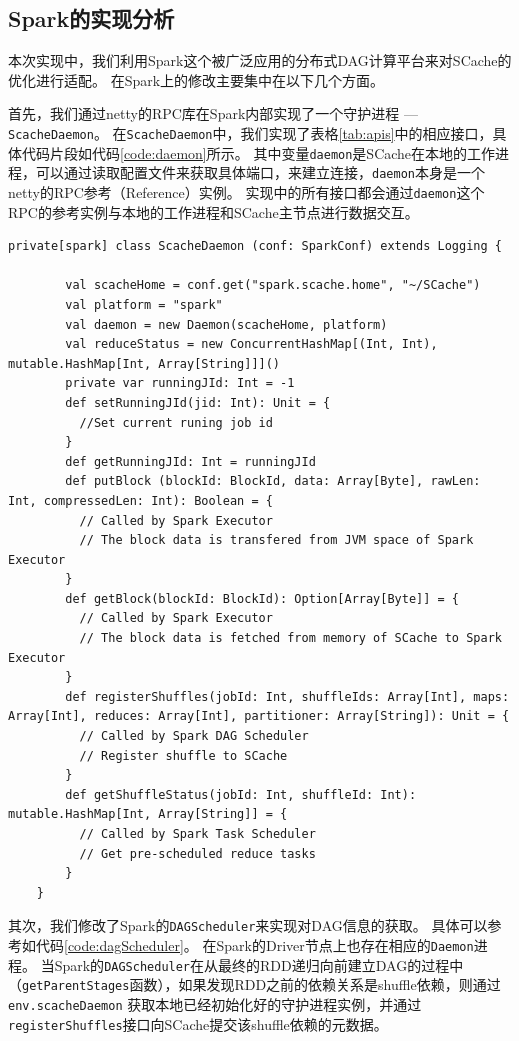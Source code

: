 \subsection{Spark的实现分析}
本次实现中，我们利用Spark这个被广泛应用的分布式DAG计算平台来对SCache的优化进行适配。
在Spark上的修改主要集中在以下几个方面。

首先，我们通过netty\cite{netty}的RPC库在Spark内部实现了一个守护进程 --- \verb|ScacheDaemon|。
在\verb|ScacheDaemon|中，我们实现了表格\ref{tab:apis}中的相应接口，具体代码片段如代码\ref{code:daemon}所示。
其中变量\verb|daemon|是SCache在本地的工作进程，可以通过读取配置文件来获取具体端口，来建立连接，\verb|daemon|本身是一个netty的RPC参考（Reference）实例。
实现中的所有接口都会通过\verb|daemon|这个RPC的参考实例与本地的工作进程和SCache主节点进行数据交互。

\begin{lstlisting}[style={myScalastyle}, caption={ScacheDaemon代码片段}, label={code:daemon}]
    private[spark] class ScacheDaemon (conf: SparkConf) extends Logging {

        val scacheHome = conf.get("spark.scache.home", "~/SCache")
        val platform = "spark"  
        val daemon = new Daemon(scacheHome, platform)   
        val reduceStatus = new ConcurrentHashMap[(Int, Int), mutable.HashMap[Int, Array[String]]]() 
        private var runningJId: Int = -1    
        def setRunningJId(jid: Int): Unit = {
          //Set current runing job id
        }   
        def getRunningJId: Int = runningJId 
        def putBlock (blockId: BlockId, data: Array[Byte], rawLen: Int, compressedLen: Int): Boolean = {
          // Called by Spark Executor
          // The block data is transfered from JVM space of Spark Executor
        }   
        def getBlock(blockId: BlockId): Option[Array[Byte]] = {
          // Called by Spark Executor
          // The block data is fetched from memory of SCache to Spark Executor
        }   
        def registerShuffles(jobId: Int, shuffleIds: Array[Int], maps: Array[Int], reduces: Array[Int], partitioner: Array[String]): Unit = {
          // Called by Spark DAG Scheduler
          // Register shuffle to SCache
        }   
        def getShuffleStatus(jobId: Int, shuffleId: Int): mutable.HashMap[Int, Array[String]] = {
          // Called by Spark Task Scheduler
          // Get pre-scheduled reduce tasks
        }   
    }
\end{lstlisting}

其次，我们修改了Spark的\verb|DAGScheduler|来实现对DAG信息的获取。
具体可以参考如代码\ref{code:dagScheduler}。
在Spark的Driver节点上也存在相应的\verb|Daemon|进程。
当Spark的\verb|DAGScheduler|在从最终的RDD递归向前建立DAG的过程中（\verb|getParentStages|函数），如果发现RDD之前的依赖关系是shuffle依赖，则通过\verb|env.scacheDaemon|
获取本地已经初始化好的守护进程实例，并通过\verb|registerShuffles|接口向SCache提交该shuffle依赖的元数据。

